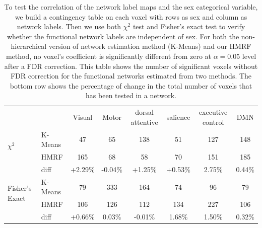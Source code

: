 \documentclass[review,authoryear]{elsarticle}
\begin{document}
\begin{table}
\centering
\begin{tabular}{llcccccc}
\toprule
& & Visual & Motor & dorsal attentive & salience & executive control & DMN \\
\cline{2-8}
\multirow{2}{*}{$\chi^2$} & K-Means & 47 & 65 & 138 & 51 & 127 & 148\\
\cline{3-8}
& HMRF & 165 & 68 & 58 & 70 & 151 &  185 \\
& diff & +2.29\% & -0.04\% & +1.25\% & +0.53\% & 2.75\% & 0.44\% \\

\cline{1-8}
\multirow{2}{*}{Fisher's Exact} & K-Means & 79 & 333 & 164 & 74 & 96 & 79\\
\cline{3-8}
& HMRF & 106 & 126 & 112 & 134 & 227 & 106 \\
& diff & +0.66\% & 0.03\% & -0.01\% & 1.68\% & 1.50\% & 0.32\% \\
\bottomrule
\end{tabular}
\caption{To test the correlation of the network label maps and the sex
  categorical variable, we build a contingency table on each voxel with rows as
  sex and column as network labels. Then we use both $\chi^2$ test and Fisher's
  exact test to verify whether the functional network labels are independent of
  sex.  For both the non-hierarchical version of network estimation method
  (K-Means) and our HMRF method, no voxel's coefficient is significantly
  different from zero at $\alpha = 0.05$ level after a FDR correction. This
  table shows the number of significant voxels without FDR correction for the
  functional networks estimated from two methods. The bottom row shows the
  percentage of change in the total number of voxels that has been tested in a
  network. }
\end{table}

\end{document}
